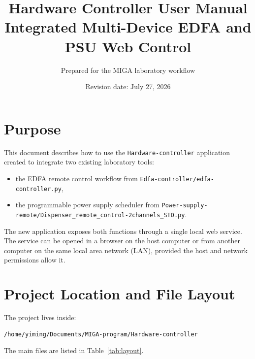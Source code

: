 \documentclass[11pt,a4paper]{article}
\title{\textbf{Hardware Controller User Manual}\\[0.4em]
\large Integrated Multi-Device EDFA and PSU Web Control}
\author{Prepared for the MIGA laboratory workflow}
\date{Revision date: July 27, 2026}
\begin{document}
\maketitle

\tableofcontents
\newpage

\section{Purpose}
This document describes how to use the \texttt{Hardware-controller} application created to integrate two existing laboratory tools:
\begin{itemize}[leftmargin=1.5em]
    \item the EDFA remote control workflow from \texttt{Edfa-controller/edfa-controller.py},
    \item the programmable power supply scheduler from \texttt{Power-supply-remote/Dispenser\_remote\_control-2channels\_STD.py}.
\end{itemize}

The new application exposes both functions through a single local web service. The service can be opened in a browser on the host computer or from another computer on the same local area network (LAN), provided the host and network permissions allow it.

\section{Project Location and File Layout}
The project lives inside:

\begin{lstlisting}[style=migacode]
/home/yiming/Documents/MIGA-program/Hardware-controller
\end{lstlisting}

The main files are listed in Table~\ref{tab:layout}.
\end{document}
